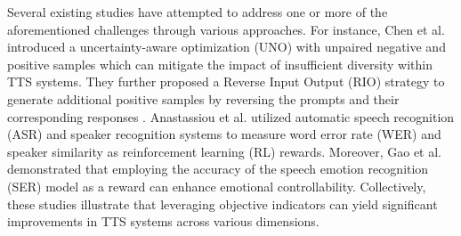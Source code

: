 \documentclass[a4paper]{article}
\begin{document}


Several existing studies \cite{tts_rlhf, chen_enhancing_2024, hu2024robustzeroshottexttospeechsynthesis, anastassiou_seed-tts_2024, gao_emo-dpo_2024} have attempted to address one or more of the aforementioned challenges through various approaches. For instance, Chen et al. \cite{chen_enhancing_2024} introduced a uncertainty-aware optimization (UNO) with  unpaired negative and positive samples which can mitigate the impact of insufficient diversity within TTS systems. They further proposed a Reverse Input Output (RIO) strategy to generate additional positive samples by reversing the prompts and their corresponding responses \cite{hu2024robustzeroshottexttospeechsynthesis}. Anastassiou et al. \cite{anastassiou_seed-tts_2024} utilized automatic speech recognition (ASR) and speaker recognition systems to measure word error rate (WER) and speaker similarity as reinforcement learning (RL) rewards. Moreover, Gao et al. \cite{gao_emo-dpo_2024} demonstrated that employing the accuracy of the speech emotion recognition (SER) model as a reward can enhance emotional controllability. Collectively, these studies illustrate that leveraging objective indicators can yield significant improvements in TTS systems across various dimensions.
\end{document}
